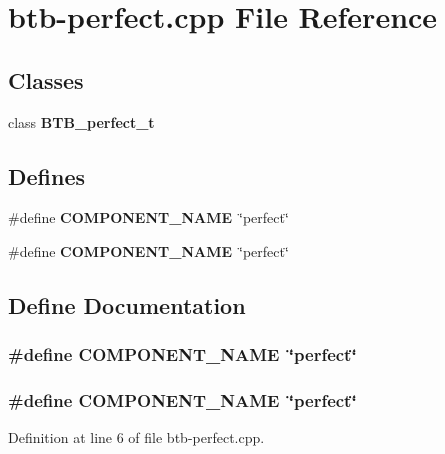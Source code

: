 \section{btb-perfect.cpp File Reference}
\label{btb-perfect_8cpp}
\subsection*{Classes}
\begin{CompactItemize}
\item 
class {\bf BTB\_\-perfect\_\-t}
\end{CompactItemize}
\subsection*{Defines}
\begin{CompactItemize}
\item 
\#define {\bf COMPONENT\_\-NAME}~\char`\"{}perfect\char`\"{}
\item 
\#define {\bf COMPONENT\_\-NAME}~\char`\"{}perfect\char`\"{}
\end{CompactItemize}


\subsection{Define Documentation}
\subsubsection[{COMPONENT\_\-NAME}]{\setlength{\rightskip}{0pt plus 5cm}\#define COMPONENT\_\-NAME~\char`\"{}perfect\char`\"{}}\label{zesto-bpred_8cpp_9146ade7ce24e3db226a973a59063892}


\subsubsection[{COMPONENT\_\-NAME}]{\setlength{\rightskip}{0pt plus 5cm}\#define COMPONENT\_\-NAME~\char`\"{}perfect\char`\"{}}\label{btb-perfect_8cpp_9146ade7ce24e3db226a973a59063892}




Definition at line 6 of file btb-perfect.cpp.